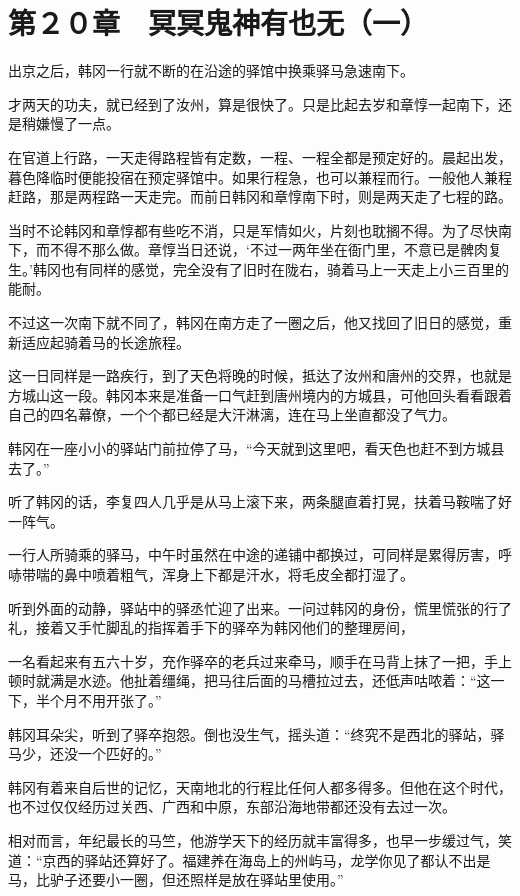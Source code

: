 \section{第２０章　冥冥鬼神有也无（一）}

出京之后，韩冈一行就不断的在沿途的驿馆中换乘驿马急速南下。

才两天的功夫，就已经到了汝州，算是很快了。只是比起去岁和章惇一起南下，还是稍嫌慢了一点。

在官道上行路，一天走得路程皆有定数，一程、一程全都是预定好的。晨起出发，暮色降临时便能投宿在预定驿馆中。如果行程急，也可以兼程而行。一般他人兼程赶路，那是两程路一天走完。而前日韩冈和章惇南下时，则是两天走了七程的路。

当时不论韩冈和章惇都有些吃不消，只是军情如火，片刻也耽搁不得。为了尽快南下，而不得不那么做。章惇当日还说，‘不过一两年坐在衙门里，不意已是髀肉复生。’韩冈也有同样的感觉，完全没有了旧时在陇右，骑着马上一天走上小三百里的能耐。

不过这一次南下就不同了，韩冈在南方走了一圈之后，他又找回了旧日的感觉，重新适应起骑着马的长途旅程。

这一日同样是一路疾行，到了天色将晚的时候，抵达了汝州和唐州的交界，也就是方城山这一段。韩冈本来是准备一口气赶到唐州境内的方城县，可他回头看看跟着自己的四名幕僚，一个个都已经是大汗淋漓，连在马上坐直都没了气力。

韩冈在一座小小的驿站门前拉停了马，“今天就到这里吧，看天色也赶不到方城县去了。”

听了韩冈的话，李复四人几乎是从马上滚下来，两条腿直着打晃，扶着马鞍喘了好一阵气。

一行人所骑乘的驿马，中午时虽然在中途的递铺中都换过，可同样是累得厉害，呼哧带喘的鼻中喷着粗气，浑身上下都是汗水，将毛皮全都打湿了。

听到外面的动静，驿站中的驿丞忙迎了出来。一问过韩冈的身份，慌里慌张的行了礼，接着又手忙脚乱的指挥着手下的驿卒为韩冈他们的整理房间，

一名看起来有五六十岁，充作驿卒的老兵过来牵马，顺手在马背上抹了一把，手上顿时就满是水迹。他扯着缰绳，把马往后面的马槽拉过去，还低声咕哝着：“这一下，半个月不用开张了。”

韩冈耳朵尖，听到了驿卒抱怨。倒也没生气，摇头道：“终究不是西北的驿站，驿马少，还没一个匹好的。”

韩冈有着来自后世的记忆，天南地北的行程比任何人都多得多。但他在这个时代，也不过仅仅经历过关西、广西和中原，东部沿海地带都还没有去过一次。

相对而言，年纪最长的马竺，他游学天下的经历就丰富得多，也早一步缓过气，笑道：“京西的驿站还算好了。福建养在海岛上的州屿马，龙学你见了都认不出是马，比驴子还要小一圈，但还照样是放在驿站里使用。”

